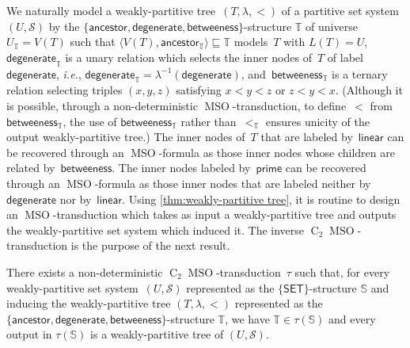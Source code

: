 \documentclass{lmcs} %
\newcommand{\MSO}{\ensuremath{\operatorname{MSO}}\xspace}
\newcommand{\CMSO}[1][]{\ensuremath{\C[#1]{\!\!}\MSO}\xspace}
\newcommand{\C}[1][]{\ensuremath{\operatorname{C}_{#1}}\xspace}
\newcommand{\ancestor}{\mathsf{ancestor}}
\newcommand{\betweeness}{\mathsf{betweeness}}
\newcommand\struct[1]{\ensuremath{\langle#1\rangle}}
\newcommand{\SET}{\ensuremath{\mathsf{SET}}\xspace}
\newcommand\DEGENERATE{\ensuremath{\mathsf{degenerate}}\xspace}
\newcommand\PRIME{\ensuremath{\mathsf{prime}}\xspace}
\newcommand\LINEAR{\ensuremath{\mathsf{linear}}\xspace}
\def\ie{{\em i.e.}}
\begin{document}
We naturally model a weakly-partitive tree~$(T,\lambda,<)$ of a partitive set system $(U,\mathcal{S})$
by the $\{\ancestor,\DEGENERATE,\betweeness\}$-structure $\mathbb{T}$
of universe $U_{\mathbb{T}}=V(T)$ such that
$\struct{V(T),\ancestor_{\mathbb{T}}}\sqsubseteq\mathbb{T}$ models~$T$ with ${L(T)=U}$,
$\DEGENERATE_{\mathbb{T}}$ is a unary relation
which selects the inner nodes of~$T$ of label~$\DEGENERATE$,
\ie, ${\DEGENERATE_{\mathbb{T}}=\lambda^{-1}(\DEGENERATE)}$,
and~$\betweeness_{\mathbb{T}}$ is a ternary relation selecting triples $(x,y,z)$ satisfying $x<y<z$ or $z<y<x$.
(Although it is possible, through a non-deterministic \MSO-transduction, to define~$<$ from~$\betweeness_{\mathbb{T}}$,
the use of $\betweeness_{\mathbb{T}}$ rather than~$<_{\mathbb{T}}$ ensures unicity of the output weakly-partitive tree.)
The inner nodes of~$T$ that are labeled by~$\LINEAR$ can be recovered through an \MSO-formula as those inner nodes whose children are related by~$\betweeness$.
The inner nodes labeled by~$\PRIME$ can be recovered through an \MSO-formula as those inner nodes that are labeled neither by~$\DEGENERATE$ nor by~$\LINEAR$.
Using \autoref{thm:weakly-partitive tree},
it is routine to design an \MSO-transduction
which takes as input a weakly-partitive tree
and outputs the weakly-partitive set system which induced it.
The inverse \CMSO[2]-transduction is the purpose of the next result. 
\begin{thm}
    \label{thm:transduce weakly-partitive tree}%
    There exists a non-deterministic \CMSO[2]-transduction~$\tau$
    such that,
    for every weakly-partitive set system~$(U,\mathcal{S})$
    represented as the $\{\SET\}$-structure $\mathbb{S}$
    and inducing the weakly-partitive tree $(T,\lambda,<)$
    represented as the $\{\ancestor,\DEGENERATE,\betweeness\}$-structure $\mathbb{T}$,
    we have $\mathbb{T}\in\tau(\mathbb{S})$
    and every output in $\tau(\mathbb{S})$ is a weakly-partitive tree of $(U,\mathcal{S})$.
\end{thm}
\end{document}
